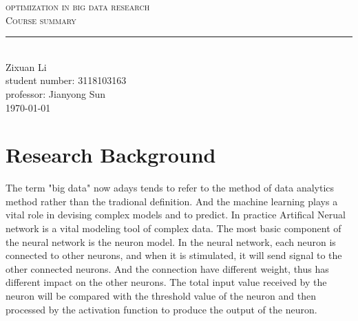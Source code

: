\documentclass[aps,letterpaper,10pt]{article}
\newcommand{\labtitle}{Course summary}
\newcommand{\authorname}{Zixuan Li}
\newcommand{\professor}{Jianyong Sun}
\newcommand{\classno}{3118103163}
\begin{document}


\begin{titlepage}
\begin{center}
{\LARGE \textsc{optimization in big data research} \\ \vspace{4pt}}
{\Large \textsc{\labtitle} \\ \vspace{4pt}}
\rule[13pt]{\textwidth}{1pt} \\ \vspace{150pt}
{\large  \authorname \\ \vspace{10pt}
student number: \classno\\ \vspace{10pt}
professor: \professor \\ \vspace{10pt}
\today}
\end{center}
\end{titlepage}

\newpage
\tableofcontents

\newpage
\section{Research Background}

The term "big data" now adays tends to refer to the method of data analytics method rather than the tradional definition. And the machine learning plays a vital role in devising complex models and to predict. In practice Artifical Nerual network is a vital modeling tool of complex data. The most basic component of the neural network is the neuron model. In the neural network, each neuron is connected to other neurons, and when it is stimulated, it will send signal to the other connected neurons. And the connection have different weight, thus has different impact on the other neurons. The total input value received by the neuron will be compared with the threshold value of the neuron and then processed by the activation function to produce the output of the neuron.\vspace{3mm}
\end{document}

